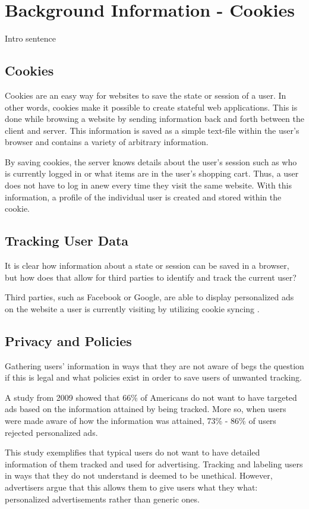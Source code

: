 \chapter{Background Information - Cookies}
\label{ch:bg_cookies}
Intro sentence


%
%
\section{Cookies}
\label{sec:bg_cookies:cookies}
Cookies are an easy way for websites to save the state or session of a user. In other words, cookies make it possible to create stateful web applications. This is done while browsing a website by sending information back and forth between the client and server. This information is saved as a simple text-file within the user's browser and contains a variety of arbitrary information. \cite{cookies1}

By saving cookies, the server knows details about the user's session such as who is currently logged in or what items are in the user's shopping cart. Thus, a user does not have to log in anew every time they visit the same website. With this information, a profile of the individual user is created and stored within the cookie. \cite{cookies1}



%
%
\section{Tracking User Data}
\label{sec:bg_cookies:data}
It is clear how information about a state or session can be saved in a browser, but how does that allow for third parties to identify and track the current user?

Third parties, such as Facebook or Google, are able to display personalized ads on the website a user is currently visiting by utilizing cookie syncing \cite{cookies2}.

%
%
\section{Privacy and Policies}
\label{sec:bg_cookies:privacy}

Gathering users' information in ways that they are not aware of begs the question if this is legal and what policies exist in order to save users of unwanted tracking.

A study from 2009 showed that 66\% of Americans do not want to have targeted ads based on the information attained by being tracked. More so, when users were made aware of how the information was attained, 73\% - 86\% of users rejected personalized ads. \cite{americansRejectAds}

This study exemplifies that typical users do not want to have detailed information of them tracked and used for advertising. Tracking and labeling users in ways that they do not understand is deemed to be unethical. However, advertisers argue that this allows them to give users what they what: personalized advertisements rather than generic ones. \cite{americansRejectAds}

